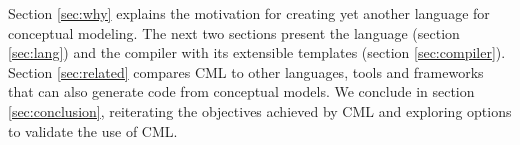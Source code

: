 Section \ref{sec:why} explains the motivation for creating yet another language for conceptual modeling.
The next two sections present the language (section \ref{sec:lang}) and the compiler with its extensible templates (section \ref{sec:compiler}).
Section \ref{sec:related} compares CML to other languages, tools and frameworks
that can also generate code from conceptual models.
We conclude in section \ref{sec:conclusion},
reiterating the objectives achieved by CML and exploring options to validate the use of CML.
